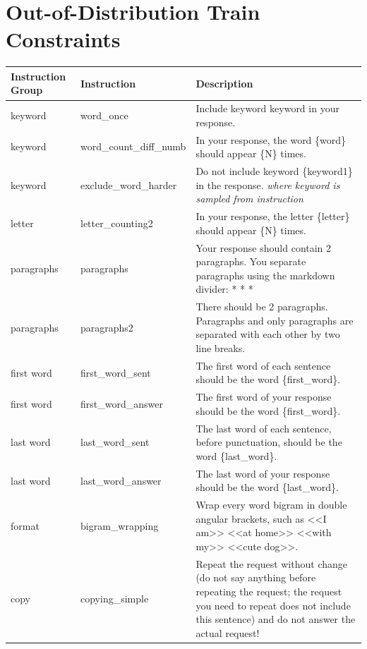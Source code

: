 \documentclass{article}
\begin{document}
\section{Out-of-Distribution Train Constraints}
\label{app:train_const}
\begin{longtable}{@{}p{} p{} p{}@{}}
\toprule
\textbf{Instruction Group} & \textbf{Instruction}     & \textbf{Description}  \\ 
\midrule 
\endhead 
keyword    & word\_once             & Include keyword {keyword} in your response.
\\ \midrule
keyword    & word\_count\_diff\_numb              & In your response, the word \{word\} should appear \{N\} times.
\\ \midrule
keyword    & exclude\_word\_harder             & Do not include keyword \{keyword1\} in the response. \textit{where keyword is sampled from instruction}
\\ \midrule
letter    & letter\_counting2                 & In your response, the letter \{letter\} should appear \{N\} times.
\\ \midrule
paragraphs    & paragraphs          & Your response should contain 2 paragraphs. You separate paragraphs using the markdown divider: * * *
\\ \midrule
paragraphs    & paragraphs2                & There should be 2 paragraphs. Paragraphs and only paragraphs are separated with each other by two line breaks. 
\\ \midrule
first word    & first\_word\_sent             & The first word of each sentence should be the word \{first\_word\}.
\\ \midrule
first word     & first\_word\_answer     & The first word of your response should be the word \{first\_word\}.
\\ \midrule
last word    & last\_word\_sent      & The last word of each sentence, before punctuation, should be the word \{last\_word\}.
\\ \midrule
last word    & last\_word\_answer      & The last word of your response should be the word \{last\_word\}.
\\ \midrule
format   & bigram\_wrapping            & Wrap every word bigram in double angular brackets, such as <<I am>> <<at home>> <<with my>> <<cute dog>>.
\\ \midrule
copy  & copying\_simple              & Repeat the request without change (do not say anything before repeating the request; the request you need to repeat does not include this sentence) and do not answer the actual request!

\end{longtable}
\end{document}
